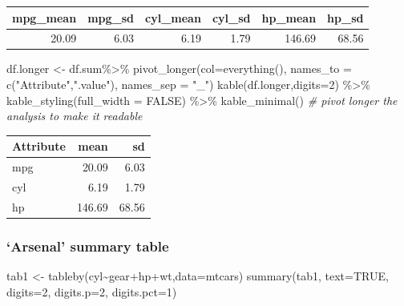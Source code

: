 \documentclass[
]{article}
\newenvironment{Shaded}{\begin{snugshade}}{\end{snugshade}}
\newcommand{\AttributeTok}[1]{\textcolor[rgb]{0.77,0.63,0.00}{#1}}
\newcommand{\CommentTok}[1]{\textcolor[rgb]{0.56,0.35,0.01}{\textit{#1}}}
\newcommand{\ConstantTok}[1]{\textcolor[rgb]{0.00,0.00,0.00}{#1}}
\newcommand{\DecValTok}[1]{\textcolor[rgb]{0.00,0.00,0.81}{#1}}
\newcommand{\FunctionTok}[1]{\textcolor[rgb]{0.00,0.00,0.00}{#1}}
\newcommand{\NormalTok}[1]{#1}
\newcommand{\OtherTok}[1]{\textcolor[rgb]{0.56,0.35,0.01}{#1}}
\newcommand{\SpecialCharTok}[1]{\textcolor[rgb]{0.00,0.00,0.00}{#1}}
\newcommand{\StringTok}[1]{\textcolor[rgb]{0.31,0.60,0.02}{#1}}
\begin{document}
\begin{table}
\centering
\begin{tabular}{r|r|r|r|r|r}
\hline
mpg\_mean & mpg\_sd & cyl\_mean & cyl\_sd & hp\_mean & hp\_sd\\
\hline
20.09 & 6.03 & 6.19 & 1.79 & 146.69 & 68.56\\
\hline
\end{tabular}
\end{table}

\begin{Shaded}
\begin{Highlighting}[]
\NormalTok{df.longer }\OtherTok{\textless{}{-}}\NormalTok{ df.sum}\SpecialCharTok{\%\textgreater{}\%} \FunctionTok{pivot\_longer}\NormalTok{(}\AttributeTok{col=}\FunctionTok{everything}\NormalTok{(),  }
\AttributeTok{names\_to =} \FunctionTok{c}\NormalTok{(}\StringTok{"Attribute"}\NormalTok{,}\StringTok{".value"}\NormalTok{),}
  \AttributeTok{names\_sep =} \StringTok{"\_"}\NormalTok{)}
\FunctionTok{kable}\NormalTok{(df.longer,}\AttributeTok{digits=}\DecValTok{2}\NormalTok{) }\SpecialCharTok{\%\textgreater{}\%}
  \FunctionTok{kable\_styling}\NormalTok{(}\AttributeTok{full\_width =} \ConstantTok{FALSE}\NormalTok{) }\SpecialCharTok{\%\textgreater{}\%}
  \FunctionTok{kable\_minimal}\NormalTok{() }\CommentTok{\# pivot longer the analysis to make it readable}
\end{Highlighting}
\end{Shaded}

\begin{table}
\centering
\begin{tabular}{l|r|r}
\hline
Attribute & mean & sd\\
\hline
mpg & 20.09 & 6.03\\
\hline
cyl & 6.19 & 1.79\\
\hline
hp & 146.69 & 68.56\\
\hline
\end{tabular}
\end{table}

\hypertarget{arsenal-summary-table}{%
\subsubsection{`Arsenal' summary table}\label{arsenal-summary-table}}

\begin{Shaded}
\begin{Highlighting}[]
\NormalTok{tab1 }\OtherTok{\textless{}{-}} \FunctionTok{tableby}\NormalTok{(cyl}\SpecialCharTok{\textasciitilde{}}\NormalTok{gear}\SpecialCharTok{+}\NormalTok{hp}\SpecialCharTok{+}\NormalTok{wt,}\AttributeTok{data=}\NormalTok{mtcars)}
\FunctionTok{summary}\NormalTok{(tab1, }\AttributeTok{text=}\ConstantTok{TRUE}\NormalTok{, }\AttributeTok{digits=}\DecValTok{2}\NormalTok{, }\AttributeTok{digits.p=}\DecValTok{2}\NormalTok{, }\AttributeTok{digits.pct=}\DecValTok{1}\NormalTok{)}
\end{Highlighting}
\end{Shaded}
\end{document}
